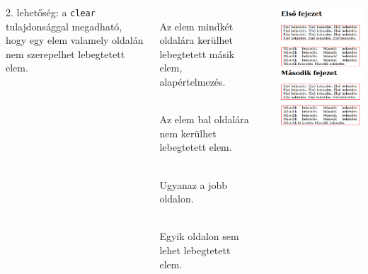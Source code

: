 \begin{frame}
  \begin{columns}[c]
      \footnotesize
      2. lehetőség: a \texttt{clear} tulajdonsággal megadható, hogy egy elem valamely oldalán nem szerepelhet lebegtetett elem.
      \begin{description}[m]
        \item[\texttt{none}] \hfill \\ Az elem mindkét oldalára kerülhet lebegtetett másik elem, alapértelmezés.
        \item[\texttt{left}] \hfill \\ Az elem bal oldalára nem kerülhet lebegtetett elem.
        \item[\texttt{right}] \hfill \\ Ugyanaz a jobb oldalon.
        \item[\texttt{both}] \hfill \\ Egyik oldalon sem lehet lebegtetett elem.
      \end{description}
      \begin{exampleblock}{}
        \scriptsize
        
      \end{exampleblock}
      \begin{exampleblock}{}
        \includegraphics[width=\textwidth]{lebeg4.png}

\end{exampleblock}
\end{columns}
\end{frame}

